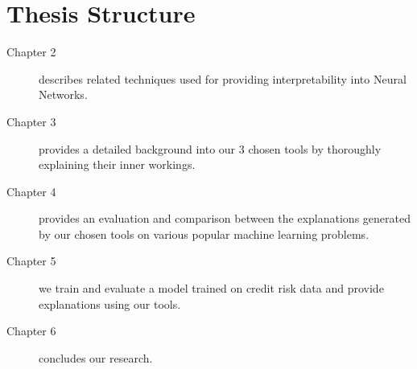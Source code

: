 \section{Thesis Structure}
\begin{description}
 \item[Chapter 2] describes related techniques used for providing interpretability into Neural Networks.
 \item[Chapter 3] provides a detailed background into our 3 chosen tools by thoroughly explaining their inner workings.
 \item[Chapter 4] provides an evaluation and comparison between the explanations generated by our chosen tools on various popular machine learning problems.
 \item[Chapter 5] we train and evaluate a model trained on credit risk data and provide explanations using our tools.
 \item[Chapter 6] concludes our research.
\end{description}
